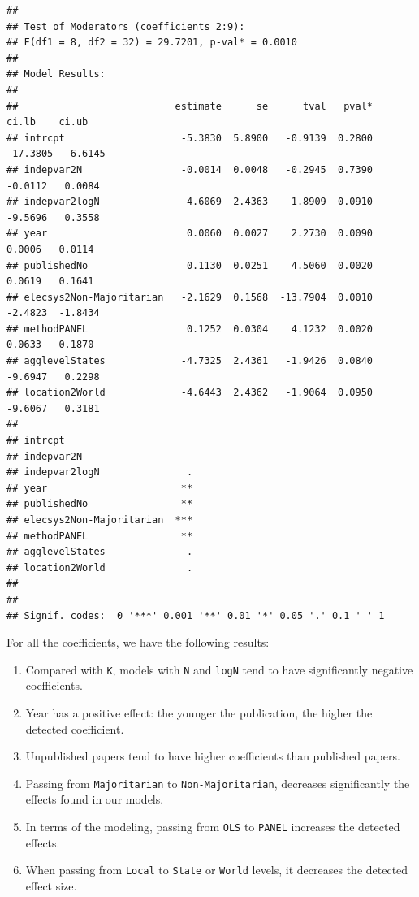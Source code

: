 \documentclass[
]{article}
\providecommand{\tightlist}{%
  \setlength{\itemsep}{0pt}\setlength{\parskip}{0pt}}
\begin{document}
\begin{verbatim}
## 
## Test of Moderators (coefficients 2:9):
## F(df1 = 8, df2 = 32) = 29.7201, p-val* = 0.0010
## 
## Model Results:
## 
##                           estimate      se      tval   pval*     ci.lb    ci.ub 
## intrcpt                    -5.3830  5.8900   -0.9139  0.2800  -17.3805   6.6145 
## indepvar2N                 -0.0014  0.0048   -0.2945  0.7390   -0.0112   0.0084 
## indepvar2logN              -4.6069  2.4363   -1.8909  0.0910   -9.5696   0.3558 
## year                        0.0060  0.0027    2.2730  0.0090    0.0006   0.0114 
## publishedNo                 0.1130  0.0251    4.5060  0.0020    0.0619   0.1641 
## elecsys2Non-Majoritarian   -2.1629  0.1568  -13.7904  0.0010   -2.4823  -1.8434 
## methodPANEL                 0.1252  0.0304    4.1232  0.0020    0.0633   0.1870 
## agglevelStates             -4.7325  2.4361   -1.9426  0.0840   -9.6947   0.2298 
## location2World             -4.6443  2.4362   -1.9064  0.0950   -9.6067   0.3181 
##  
## intrcpt 
## indepvar2N 
## indepvar2logN               . 
## year                       ** 
## publishedNo                ** 
## elecsys2Non-Majoritarian  *** 
## methodPANEL                ** 
## agglevelStates              . 
## location2World              . 
## 
## ---
## Signif. codes:  0 '***' 0.001 '**' 0.01 '*' 0.05 '.' 0.1 ' ' 1
\end{verbatim}

For all the coefficients, we have the following results:

\begin{enumerate}
\def\labelenumi{\arabic{enumi}.}
\tightlist
\item
  Compared with \texttt{K}, models with \texttt{N} and \texttt{logN}
  tend to have significantly negative coefficients.
\item
  Year has a positive effect: the younger the publication, the higher
  the detected coefficient.
\item
  Unpublished papers tend to have higher coefficients than published
  papers.
\item
  Passing from \texttt{Majoritarian} to \texttt{Non-Majoritarian},
  decreases significantly the effects found in our models.
\item
  In terms of the modeling, passing from \texttt{OLS} to \texttt{PANEL}
  increases the detected effects.
\item
  When passing from \texttt{Local} to \texttt{State} or \texttt{World}
  levels, it decreases the detected effect size.
\end{enumerate}
\end{document}
